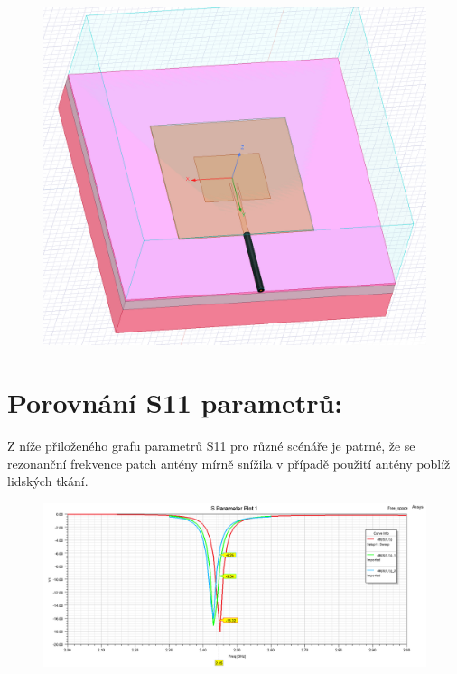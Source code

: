 \documentclass[10pt, a4paper]{article}%
\begin{document}
\begin{figure}[ht!]
\begin{minipage}{0.32\textwidth}
	\end{minipage}
	\hfill
	\begin{minipage}{0.32\textwidth}
		\centering
		\includegraphics[width= 1\textwidth,height = 0.25\textheight]{3D_model_koax.png}
	\end{minipage}
	\end{figure}

\section{\Large Porovnání S11 parametrů:}
Z níže přiloženého grafu parametrů S11 pro různé scénáře je patrné, že se 
rezonanční frekvence patch antény mírně snížila v případě použití antény
poblíž lidských tkání.
\begin{figure}[ht!]	
\centering
		\includegraphics[height = 0.3\textheight]{S11_free_space.png}
\end{figure}
\clearpage
\end{document}
